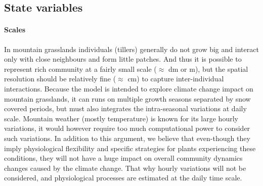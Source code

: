 \documentclass[a4paper,twoside, justified,marginals=raggedright, nobib]{tufte-handout}
\begin{document}
\subsection{State variables}

\paragraph{Scales}
In mountain grasslands individuals (tillers) generally do not grow big and interact only with close neighbours and form little patches. And thus it is possible to represent rich community at a fairly small scale ($\approx$ dm or m), but the spatial resolution should be relatively fine ($\approx$ cm) to capture inter-individual interactions. Because the model is intended to explore climate change impact on mountain grasslands, it can runs on multiple growth seasons separated by snow covered periods, but must also integrates the intra-seasonal variations at daily scale. Mountain weather (mostly temperature) is known for its large hourly variations, it would however require too much computational power to consider such variations. In addition  to this argument, we believe that even-though  they imply physiological flexibility and specific strategies for plants experiencing these conditions, they will not have a huge impact on overall community dynamics changes caused by the climate change. That why hourly variations will not be considered, and physiological processes are estimated at the daily time scale.
\end{document}
